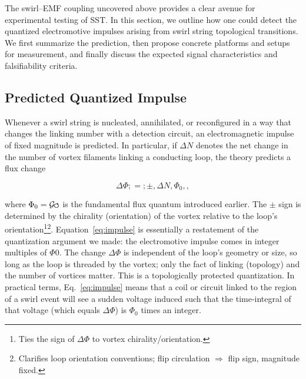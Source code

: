 \documentclass[12pt]{article}
\DeclareRobustCommand{\swirlarrow}{
\mathchoice{\mkern-2mu\scriptstyle\boldsymbol{\circlearrowleft}}%
{\mkern-2mu\scriptstyle\boldsymbol{\circlearrowleft}}%
{\mkern-2mu\scriptscriptstyle\boldsymbol{\circlearrowleft}}%
{\mkern-2mu\scriptscriptstyle\boldsymbol{\circlearrowleft}}
}%
\newcommand{\Gswirl}{\mathcal{G}\swirlarrow}
\begin{document}
The swirl–EMF coupling uncovered above provides a clear avenue for experimental testing of SST. In this section, we outline how one could detect the quantized electromotive impulses arising from swirl string topological transitions. We first summarize the prediction, then propose concrete platforms and setups for measurement, and finally discuss the expected signal characteristics and falsifiability criteria.


\subsection{Predicted Quantized Impulse}\label{sec:prediction}

Whenever a swirl string is nucleated, annihilated, or reconfigured in a way that changes the linking number with a detection circuit, an electromagnetic impulse of fixed magnitude is predicted. In particular, if $\Delta N$ denotes the net change in the number of vortex filaments linking a conducting loop, the theory predicts a flux change

\begin{equation}\label{eq:impulse}

\Delta \Phi ;=; \pm,\Delta N,\Phi_{0},,

\end{equation}

where $\Phi_{0} = \Gswirl$ is the fundamental flux quantum introduced earlier. The $\pm$ sign is determined by the chirality (orientation) of the vortex relative to the loop’s orientation\footnote{Ties the sign of $\Delta\Phi$ to vortex chirality/orientation.}\footnote{Clarifies loop orientation conventions; flip circulation $\Rightarrow$ flip sign, magnitude fixed.}. Equation~\eqref{eq:impulse} is essentially a restatement of the quantization argument we made: the electromotive impulse comes in integer multiples of $\Phi{0}$. The change $\Delta \Phi$ is independent of the loop's geometry or size, so long as the loop is threaded by the vortex; only the fact of linking (topology) and the number of vortices matter. This is a topologically protected quantization. In practical terms, Eq.~\eqref{eq:impulse} means that a coil or circuit linked to the region of a swirl event will see a sudden voltage induced such that the time-integral of that voltage (which equals $\Delta \Phi$) is $\Phi_{0}$ times an integer.
\end{document}
